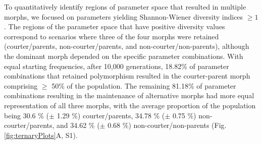 \documentclass[
  11pt,
  a4paper,
]{article}
\begin{document}
To quantitatively identify regions of parameter space that resulted in
multiple morphs, we focused on parameters yielding Shannon-Wiener
diversity indices \(\ge 1\) . The regions of the parameter space that have
positive diversity values correspond to scenarios where three of the
four morphs were retained (courter/parents, non-courter/parents, and
non-courter/non-parents), although the dominant morph depended on the
specific parameter combinations. With equal starting frequencies, after
10,000 generations, 18.82\% of parameter combinations
that retained polymorphism resulted in the courter-parent morph
comprising \(\ge\) 50\% of the population. The remaining
81.18\% of parameter combinations resulting in the
maintenance of alternative morphs had more equal representation of all
three morphs, with the average proportion of the population being
30.6 \% (\(\pm\)
1.29 \%) courter/parents,
34.78 \% (\(\pm\)
0.75 \%)
non-courter/parents, and
34.62 \% (\(\pm\)
0.68 \%)
non-courter/non-parents (Fig. \ref{fig:ternaryPlots}A, S1).
\end{document}

